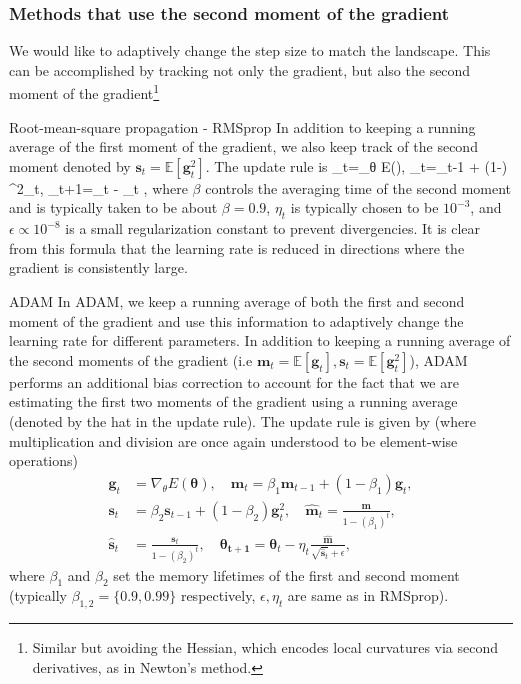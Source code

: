 \subsubsection{Methods that use the second moment of the gradient}
We would like to adaptively change the step size to match the landscape. This can be accomplished by tracking not only the gradient, but also the second moment of the gradient\footnote{Similar but avoiding the Hessian, which encodes local curvatures via second derivatives, as in Newton's method.}
\begin{mybox}{Root-mean-square propagation - RMSprop}
	In addition to keeping a running average of the first moment of the gradient, we also keep track of the second moment denoted by $\mathbf{s}_t=\mathbb{E}[\mathbf{g}^2_t]$. The update rule is 
	\be
	\label{eq:gdRMSprop}
	_t=\nabla_{θ} E(),\; _t=\beta {}_{t-1} + (1-\beta) ^2_t,\; _{t+1}=_t - \eta_t ,
		\ee 
		where $\beta$ controls the averaging time of the second moment and is typically taken to be about $\beta=0.9$, $\eta_t$ is typically chosen to be $10^{-3}$, and $\epsilon\propto 10^{-8}$ is a small regularization constant to prevent divergencies. It is clear from this formula that the learning rate is reduced in directions where the gradient is consistently large.
\end{mybox}
\begin{mybox}{ADAM}
	In ADAM, we keep a running average of both the first and second moment of the gradient and use this information to adaptively change the learning rate for different parameters. In addition to keeping a running average of the second moments of the gradient (i.e $\mathbf{m}_t= \mathbb{E}[\mathbf{g}_t], \mathbf{s}_t=\mathbb{E}[\mathbf{g}^2_t]$), ADAM performs an additional bias correction to account for the fact that we are estimating the first two moments of the gradient using a running average (denoted by the hat in the update rule). The update rule is given by (where multiplication and division are once again understood to be element-wise operations)
	\begin{align}
		\label{eq:gdADAM}
		\mathbf{g}_t &= \nabla_{θ} E(\mathbf{θ}), \quad \mathbf{m}_t =\beta_1 \mathbf{m}_{t-1} + (1-\beta_1) \mathbf{g}_t, \\
		\mathbf{s}_t &=\beta_2 \mathbf{s}_{t-1} + (1-\beta_2) \mathbf{g}^2_t,\quad \hat{\mathbf{m}}_t = \frac{\mathbf{m}}{1-(\beta_1)^t},\nonumber \\
		\hat{\mathbf{s}}_t &= \frac{\mathbf{s}_t}{1-(\beta_2)^t},\quad \mathbf{θ_{t+1}} = \mathbf{θ}_t - \eta_t \frac{\hat{\mathbf{m}}}{\sqrt{\hat{\mathbf{s}}_t} +\epsilon}\nonumber,
	\end{align}
where $\beta_1$ and $\beta_2$ set the memory lifetimes of the first and second moment (typically $\beta_{1,2} =\{0.9,0.99\}$ respectively, $\epsilon,\eta_t$ are same as in RMSprop).
\end{mybox}
